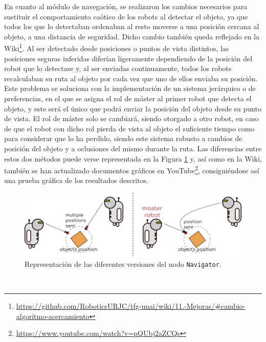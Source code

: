 En cuanto al módulo de navegación, se realizaron los cambios necesarios para
sustituir el comportamiento caótico de los robots al detectar el objeto, ya que
todos los que lo detectaban ordenaban al resto moverse a una posición cercana al
objeto, a una distancia de seguridad.
Dicho cambio también queda reflejado en la Wiki\footnote{
\href{https://github.com/RoboticsURJC/tfg-unai/wiki/11.-Mejoras-y-correcciones-del-swarm\_obj\_finder-\%5B30-Sep-\%E2\%80\%90-9-Nov\%5D\#cambio-en-la-l\%C3\%B3gica-del-algoritmo-en-el-modo-de-acercamiento-al-objeto}{https://github.com/RoboticsURJC/tfg-unai/wiki/11.-Mejoras/\#cambio-algoritmo-acercamiento}}.
Al ser detectado desde posiciones o puntos de vista distintos, las posiciones
seguras inferidas diferían ligeramente dependiendo de la posición del robot que
lo detectase y, al ser enviadas continuamente, todos los robots recalculaban su
ruta al objeto por cada vez que uno de ellos enviaba su posición.
\\

Este problema se soluciona con la implementación de un sistema jerárquico o de
preferencias, en el que se asigna el rol de máster al primer robot que detecta
el objeto, y este será el único que podrá enviar la posición del objeto desde su
punto de vista.
El rol de máster solo se cambiará, siendo otorgado a otro robot, en caso de que
el robot con dicho rol pierda de vista al objeto el suficiente tiempo como para
considerar que lo ha perdido, siendo este sistema robusto a cambios de posición
del objeto y a oclusiones del mismo durante la ruta.
Las diferencias entre estos dos métodos puede verse representada en la Figura
\ref{fig:navigator_versions} y, así como en la Wiki, también se han actualizado
documentos gráficos en YouTube\footnote{
\href{https://www.youtube.com/watch?v=pQUbj2aZCQs}{https://www.youtube.com/watch?v=pQUbj2aZCQs}},
consiguiéndose así una prueba gráfica de los resultados descritos.
\\

\begin{figure} [h!]
  \begin{center}
    \includegraphics[width=15cm]{figs/navigator_versions}
  \end{center}
  \caption{Representación de las diferentes versiones del nodo \texttt{Navigator}.}
  \label{fig:navigator_versions}
\end{figure}\



